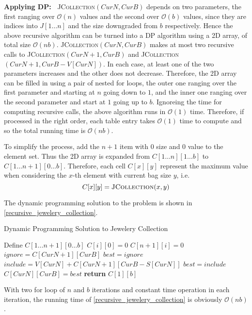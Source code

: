 \begin{homeworkProblem}
\pagebreak
\textbf{Applying DP:\ }
\textsc{JCollection}$(CurN, CurB)$ depends on two parameters, the first
ranging over $\mathcal{O}(n)$ values and the second over $\mathcal{O}(b)$
values, since they are indices into $J[1\ldots n]$ and the size downgraded
from $b$ respectively. Hence the above recursive algorithm can be turned
into a DP algorithm using a 2D array, of total size $\mathcal{O}(nb)$.
\textsc{JCollection}$(CurN, CurB)$ makes at most two recursive calls to
\textsc{JCollection}$(CurN+1, CurB)$ and
\textsc{JCollection}$(CurN+1, CurB-V[CurN])$.
In each case, at least one of the two parameters increases and the
other does not decrease. Therefore, the 2D array can be filled in
using a pair of nested for loops, the outer one ranging over the
first parameter and starting at $n$ going down to $1$, and the inner
one ranging over the second parameter and start at $1$ going up
to $b$. Ignoreing the time for computing recursive calls, the above
algorithm runs in $\mathcal{O}(1)$ time. Therefore, if processed
in the right order, each table entry takes $\mathcal{O}(1)$ time to
compute and so the total running time is $\mathcal{O}(nb)$.

To simplify the process, add the $n+1$ item with $0$ size and $0$ value
to the element set. Thus the 2D array is expanded from $C[1\ldots n][1\ldots b]$ to $C[1\ldots n+1][0\ldots b]$.
Therefore, each cell $C[x][y]$ represent the maximum value when considering the
$x$-th element with current bag size $y$, i.e. 
\[C[x][y] = \text{\textsc{JCollection}}(x,y)\]

The dynamic programming solution to the problem is shown in \cref{recursive_jewelery_collection}.

\begin{algorithm}[H]
    \caption{Dynamic Programming Solution to Jewelery Collection}\label{dp_jewelery_collection}
    \begin{algorithmic}[1]
            \State Define $C[1\ldots n+1][0\ldots b]$
                \State $C[i][0] = 0$
            \EndFor
                \State $C[n+1][i] = 0$
            \EndFor
                    \State $ignore = C[CurN+1][CurB]$
                    \State $best = ignore$
                        \State $include = V[CurN] + C[CurN+1][CurB-S[CurN]]$
                            \State $best = include$
                        \EndIf
                    \EndIf
                    \State $C[CurN][CurB] = best$
                \EndFor
            \EndFor
            \State \textbf{return }$C[1][b]$
        \EndProcedure
    \end{algorithmic}
\end{algorithm}

With two for loop of $n$ and $b$ iterations and constant time operation in each iteration, the running time of \cref{recursive_jewelery_collection} is obviously $\mathcal{O}(nb)$.

\end{homeworkProblem}
